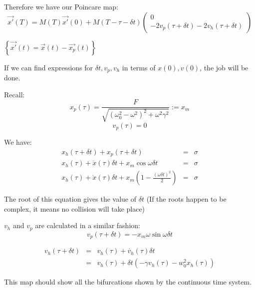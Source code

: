 \documentclass[xcolor=x11names,compress]{beamer}
\renewcommand{\(}{\begin{columns}}
\renewcommand{\)}{\end{columns}}
\newcommand{\<}[1]{\begin{column}{#1}}
\renewcommand{\>}{\end{column}}
\newcommand{\colv}[2]{\begin{pmatrix}#1\\#2\end{pmatrix}}
\begin{document}
\begin{frame}[label=poincare_slide]
Therefore we have our Poincare map:
\begin{equation}
\label{poincare-hardcol}
\vec{x'}(T)=M(T)\vec{x'}(0)+M(T-\tau-\delta t)\colv{0}{-2v_p(\tau+\delta t)-2v_h(\tau+\delta t)}
\end{equation}

\hyperlink{new_poincare_slide}{}
$\left\{\vec{x'}(t)=\vec{x}(t)-\vec{x_p}(t)\right\}$

If we can find expressions for $\delta t, v_p, v_h$ in terms of $x(0),v(0)$, 
the job will be done.  
\end{frame}

\begin{frame}
Recall:
\[
x_p(\tau)=\frac{F}{\sqrt{(\omega_0^2-\omega^2)^2+\omega^2\gamma^2}}:=x_m
\]
\[
v_p(\tau)=0
\]

We have:
\begin{eqnarray*}
x_h(\tau+\delta t)+x_p(\tau+\delta t)&=&\sigma\\
x_h(\tau)+\dot{x}(\tau)\delta t+x_m\cos{\omega \delta t}&=&\sigma\\
x_h(\tau)+\dot{x}(\tau)\delta t+x_m\left(1-\frac{(\omega \delta t)^2}{2}\right)&=&\sigma
\end{eqnarray*}

The root of this equation gives the value of $\delta t$
(If the roots happen to be complex, it means no collision will take place)
\end{frame}

\begin{frame}
$v_h$ and $v_p$ are calculated in a similar fashion:
\[
v_p(\tau+\delta t)=-x_m\omega\sin{\omega\delta t}
\]

\begin{eqnarray*}
v_h(\tau+\delta t)&=&v_h(\tau)+\dot{v_h}(\tau)\delta t\\
&=&v_h(\tau)+\delta t(-\gamma v_h(\tau)-w_0^2x_h(\tau))
\end{eqnarray*}

This map should show all the bifurcations shown by the continuous time system.  
\end{frame}
\end{document}
